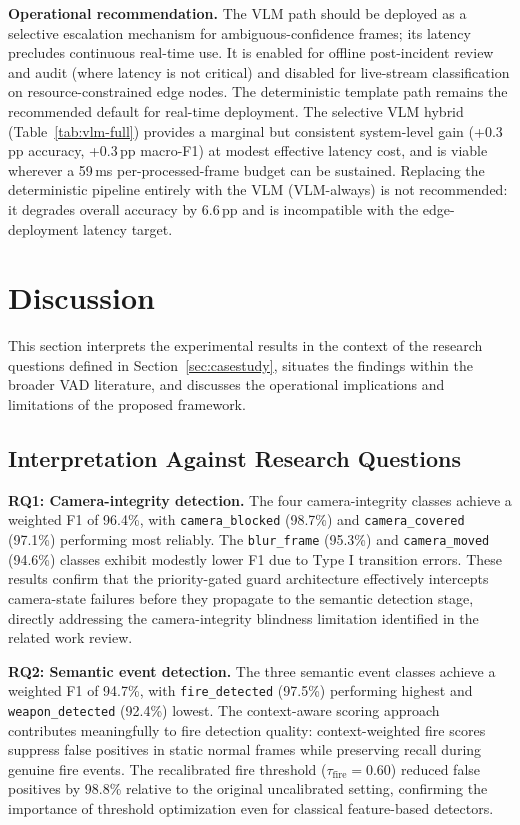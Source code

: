 \documentclass[a4paper,fleqn]{cas-dc}
\begin{document}
\textbf{Operational recommendation.}
The VLM path should be deployed as a selective escalation mechanism for ambiguous-confidence frames; its latency precludes continuous real-time use. It is enabled for offline post-incident review and audit (where latency is not critical) and disabled for live-stream classification on resource-constrained edge nodes. The deterministic template path remains the recommended default for real-time deployment. The selective VLM hybrid (Table~\ref{tab:vlm-full}) provides a marginal but consistent system-level gain (+0.3\,pp accuracy, +0.3\,pp macro-F1) at modest effective latency cost, and is viable wherever a 59\,ms per-processed-frame budget can be sustained. Replacing the deterministic pipeline entirely with the VLM (VLM-always) is not recommended: it degrades overall accuracy by 6.6\,pp and is incompatible with the edge-deployment latency target.
 
\FloatBarrier
\section{Discussion}
\label{sec:discussion}
 
This section interprets the experimental results in the context of the research questions defined in Section~\ref{sec:casestudy}, situates the findings within the broader VAD literature, and discusses the operational implications and limitations of the proposed framework.
 
\FloatBarrier
\subsection{Interpretation Against Research Questions}
 
\textbf{RQ1: Camera-integrity detection.} The four camera-integrity classes achieve a weighted F1 of 96.4\%, with \texttt{camera\_blocked} (98.7\%) and \texttt{camera\_covered} (97.1\%) performing most reliably. The \texttt{blur\_frame} (95.3\%) and \texttt{camera\_moved} (94.6\%) classes exhibit modestly lower F1 due to Type I transition errors. These results confirm that the priority-gated guard architecture effectively intercepts camera-state failures before they propagate to the semantic detection stage, directly addressing the camera-integrity blindness limitation identified in the related work review.
 
\textbf{RQ2: Semantic event detection.} The three semantic event classes achieve a weighted F1 of 94.7\%, with \texttt{fire\_detected} (97.5\%) performing highest and \texttt{weapon\_detected} (92.4\%) lowest. The context-aware scoring approach contributes meaningfully to fire detection quality: context-weighted fire scores suppress false positives in static normal frames while preserving recall during genuine fire events. The recalibrated fire threshold ($\tau_{\text{fire}} = 0.60$) reduced false positives by 98.8\% relative to the original uncalibrated setting, confirming the importance of threshold optimization even for classical feature-based detectors.
 
\end{document}
